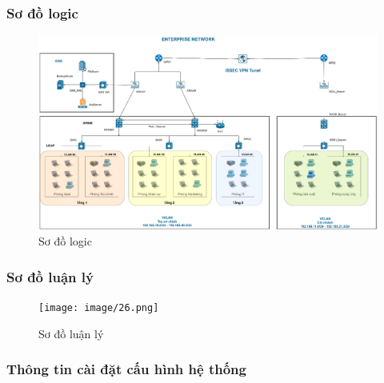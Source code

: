 \documentclass[13pt]{article}
\begin{document}
\newpage
\subsubsection{Sơ đồ logic}
    \begin{figure}[h!]
        \centering
        \includegraphics[width=1
        \linewidth]{image/25.png}
            \caption{Sơ đồ logic}
            \label{fig:label1}
    \end{figure}


\newpage
\subsubsection{Sơ đồ luận lý}
    \begin{figure}[h!]
        \centering
        \texttt{[image: image/26.png]}
            \caption{Sơ đồ luận lý}
            \label{fig:label1}
    \end{figure}


\subsubsection{Thông tin cài đặt cấu hình hệ thống}
\end{document}
